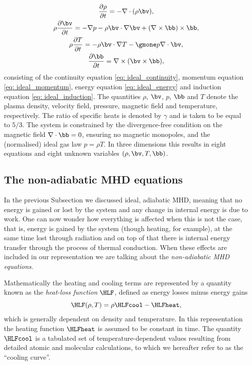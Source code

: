 \begin{gather}
  \frac{\partial \rho}{\partial t} = -\nabla \cdot (\rho \bv), \label{eq: ideal_continuity} \\
  \rho \frac{\partial \bv}{\partial t} =
    -\nabla p
    - \rho \bv \cdot \nabla \bv
    + (\nabla \times \bb) \times \bb, \label{eq: ideal_momentum}\\
  \rho \frac{\partial T}{\partial t} =
    -\rho \bv \cdot \nabla T
    -\gmone p \nabla \cdot \bv, \label{eq: ideal_energy} \\
  \frac{\partial \bb}{\partial t} = \nabla \times (\bv \times \bb), \label{eq: ideal_induction}
\end{gather}
consisting of the continuity equation \eqref{eq: ideal_continuity}, momentum equation \eqref{eq: ideal_momentum}, energy equation \eqref{eq: ideal_energy} and induction equation \eqref{eq: ideal_induction}. The quantities $\rho$, $\bv$, $p$, $\bb$ and $T$ denote the plasma density, velocity field, pressure, magnetic field and temperature, respectively. The ratio of specific heats is denoted by $\gamma$ and is taken to be equal to $5/3$. The system is constrained by the divergence-free condition on the magnetic field $\nabla \cdot \bb = 0$, ensuring no magnetic monopoles, and the (normalised) ideal gas law $p = \rho T$. In three dimensions this results in eight equations and eight unknown variables $(\rho, \bv, T, \bb)$.

\subsection{The non-adiabatic MHD equations}
In the previous Subsection we discussed ideal, adiabatic \gls{MHD}, meaning that no energy is gained or lost by the system and any change in internal energy is due to work. One can now wonder how everything is affected when this is not the case, that is, energy is gained by the system (though heating, for example), at the same time lost through radiation and on top of that there is internal energy transfer through the process of thermal conduction. When these effects are included in our representation we are talking about the \emph{non-adiabatic MHD equations}.

Mathematically the heating and cooling terms are represented by a quantity known as the \emph{heat-loss function} $\HLF$, defined as energy losses minus energy gains
\begin{equation} \label{eq: cooling_simple}
  \HLF(\rho, T) = \rho \HLFcool - \HLFheat,
\end{equation}
which is generally dependent on density and temperature. In this representation the heating function $\HLFheat$ is assumed to be constant in time. The quantity $\HLFcool$ is a tabulated set of temperature-dependent values resulting from detailed atomic and molecular calculations, to which we hereafter refer to as the ``cooling curve''.

